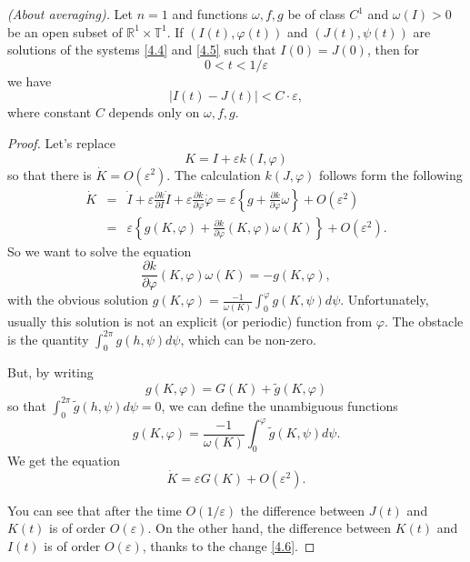 \begin{theorem}\emph{(About averaging).}
	Let $n=1$ and functions $\omega ,f,g$ be of class $C^1$ and $\omega (I)>0$ be an open subset of $\mathbb{R}^{1}\times \mathbb{T}^{1}$. If $\left( I(t),\varphi (t)\right) $ and $\left( J(t),\psi (t)\right) $ are solutions of the systems \eqref{4.4} and \eqref{4.5} such that $I(0)=J(0)$, then for
	$$
	0<t<1/\varepsilon
	$$
	we have
	$$
	\left\vert I(t)-J(t)\right\vert <C\cdot \varepsilon ,
	$$
	where constant $C$ depends only on $\omega ,f,g.$
	\begin{proof}
		Let's replace
		\begin{equation}
		\label{4.6}
		K=I+\varepsilon k(I,\varphi )
		\end{equation}
		so that there is $\dot{K}=O(\varepsilon ^{2})$. The calculation $k(J,\varphi
		)$ follows form the following
		$$
		\begin{array}{lll}
		\dot{K} &=&\dot{I}+\varepsilon \frac{\partial k}{\partial I}\dot{I}%
		+\varepsilon \frac{\partial k}{\partial \varphi }\dot{\varphi}=\varepsilon
		\left\{ g+\frac{\partial k}{\partial \varphi }\omega \right\} +O(\varepsilon
		^{2}) \\
		&=&\varepsilon \left\{ g(K,\varphi )+\frac{\partial k}{\partial \varphi }%
		(K,\varphi )\omega (K)\right\} +O(\varepsilon ^{2}).
		\end{array}
		$$
		So we want to solve the equation
		$$
		\frac{\partial k}{\partial \varphi }(K,\varphi )\omega (K)=-g(K,\varphi),
		$$
		with the obvious solution $g(K,\varphi )=\frac{-1}{\omega (K)}%
		\int_{0}^{\varphi }g(K,\psi )d\psi .$  Unfortunately, usually this solution is not an explicit (or periodic) function from $\varphi$. The obstacle is the quantity $\int_{0}^{2\pi }g(h,\psi )d\psi$, which can be non-zero.
		
		But, by writing
		$$
		g(K,\varphi )=G(K)+\tilde{g}(K,\varphi )
		$$
		so that $\int_{0}^{2\pi }\tilde{g}(h,\psi )d\psi =0$, we can define the unambiguous functions
		$$
		g(K,\varphi )=\frac{-1}{\omega (K)}\int_{0}^{\varphi }\tilde{g}(K,\psi)d\psi .
		$$
		We get the equation
		$$
		\dot{K}=\varepsilon G(K)+O(\varepsilon ^{2}).
		$$
		
		You can see that after the time $O(1/\varepsilon )$ the difference between $J(t)$ and $K(t)$ is of order $O(\varepsilon )$. On the other hand, the difference between $K (t)$ and $I (t)$ is of order $O(\varepsilon )$, thanks to the change \eqref{4.6}.
	\end{proof}
\end{theorem}

